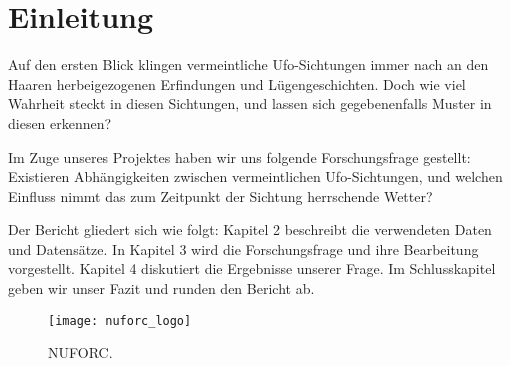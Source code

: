 \section{Einleitung} \label{einleitung}

Auf den ersten Blick klingen vermeintliche Ufo-Sichtungen immer nach an den Haaren herbeigezogenen Erfindungen und Lügengeschichten. Doch wie viel Wahrheit steckt in diesen Sichtungen, und lassen sich gegebenenfalls Muster in diesen erkennen?

Im Zuge unseres Projektes haben wir uns folgende Forschungsfrage gestellt: Existieren Abhängigkeiten zwischen vermeintlichen Ufo-Sichtungen, und welchen Einfluss nimmt das zum Zeitpunkt der Sichtung herrschende Wetter?

Der Bericht gliedert sich wie folgt: Kapitel 2 beschreibt die verwendeten Daten und Datensätze. In Kapitel 3 wird die Forschungsfrage und ihre Bearbeitung vorgestellt. Kapitel 4 diskutiert die Ergebnisse unserer Frage. Im Schlusskapitel geben wir unser Fazit und runden den Bericht ab.

\begin{figure}[t]
    \centering
    \texttt{[image: nuforc\_logo]}
    \caption{NUFORC.}
    \label{fig:nuforc}
\end{figure}